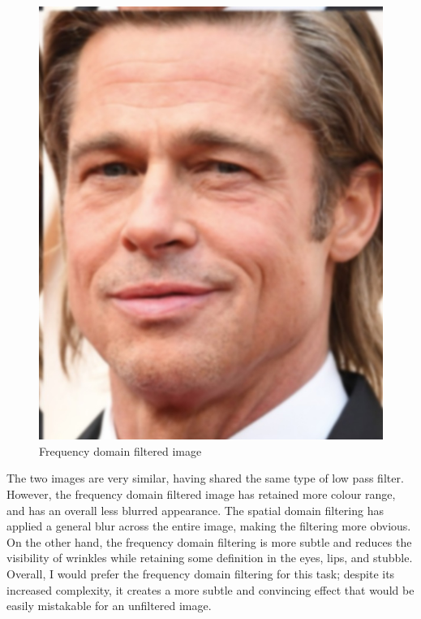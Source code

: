 \documentclass[a4paper]{article}
\begin{document}
\begin{minipage}{0.49\textwidth}
\begin{figure}[H]
    \centering
    \includegraphics[width=\textwidth]{../code/task2/output/3_filtered_color_image.jpg}
    \caption{Frequency domain filtered image}
\end{figure}
\end{minipage}

The two images are very similar, having shared the same type of low pass filter.
However, the frequency domain filtered image has retained more colour range, and has an overall less blurred appearance.
The spatial domain filtering has applied a general blur across the entire image, making the filtering more obvious.
On the other hand, the frequency domain filtering is more subtle and reduces the visibility of wrinkles while retaining some definition in the eyes, lips, and stubble.
Overall, I would prefer the frequency domain filtering for this task; despite its increased complexity, it creates a more subtle and convincing effect that would be easily mistakable for an unfiltered image.
\end{document}
